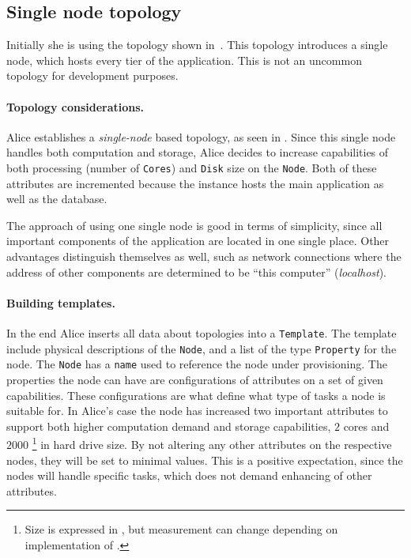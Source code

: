 \subsection{Single node topology}

Initially she is using the topology shown in~.
This topology introduces a single node, which hosts every tier of the application.
This is not an uncommon topology for development purposes.

\paragraph{Topology considerations.}

Alice establishes a \emph{single-node} based topology, as seen in .
Since this single node handles both computation and storage, 
Alice decides to increase capabilities of both processing (number of \texttt{Cores}) and 
\texttt{Disk} size on the \texttt{Node}.
Both of these attributes are incremented because the instance hosts
the main application as well as the database.

The approach of using one single node is good in terms of simplicity,
since all important components of the application are located in one single place.
Other advantages distinguish themselves as well, such as network connections where
the address of other components are determined to be ``this computer'' (\emph{localhost}).

\paragraph{Building templates.}

In the end Alice inserts all data about topologies into a \texttt{Template}. 
The template include physical descriptions of the \texttt{Node},
and a list of the type \texttt{Property} for the node.
The \texttt{Node} has a \texttt{name} used to reference the node under provisioning.
The properties the node can have are configurations of attributes on a set of given capabilities.
These configurations are what define what type of tasks a node is suitable for.
In Alice's case the node has increased two important attributes to support both higher computation 
demand and storage capabilities, \ie $2$ cores and $2000$ 
\footnote{
  Size is expressed in , but measurement can change depending on implementation of .
}
in hard drive size.
By not altering any other attributes on the respective nodes, they will be set to minimal values.
This is a positive expectation, since the nodes will handle specific tasks, which does not 
demand enhancing of other attributes.

